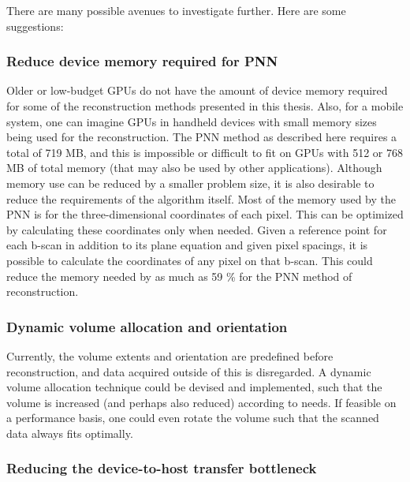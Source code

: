 There are many possible avenues to investigate further. Here are some suggestions:

\subsubsection{Reduce device memory required for PNN}

	Older or low-budget GPUs do not have the amount of device memory required for some of the reconstruction methods presented in this thesis. Also, for a mobile system, one can imagine GPUs in handheld devices with small memory sizes being used for the reconstruction. The PNN method as described here requires a total of 719 MB, and this is impossible or difficult to fit on GPUs with 512 or 768 MB of total memory (that may also be used by other applications). Although memory use can be reduced by a smaller problem size, it is also desirable to reduce the requirements of the algorithm itself. Most of the memory used by the PNN is for the three-dimensional coordinates of each pixel. This can be optimized by calculating these coordinates only when needed. Given a reference point for each b-scan in addition to its plane equation and given pixel spacings, it is possible to calculate the coordinates of any pixel on that b-scan. This could reduce the memory needed by as much as 59 \% for the PNN method of reconstruction.

\subsubsection{Dynamic volume allocation and orientation}

	Currently, the volume extents and orientation are predefined before reconstruction, and data acquired outside of this is disregarded. A dynamic volume allocation technique could be devised and implemented, such that the volume is increased (and perhaps also reduced) according to needs. If feasible on a performance basis, one could even rotate the volume such that the scanned data always fits optimally.

\subsubsection{Reducing the device-to-host transfer bottleneck}

